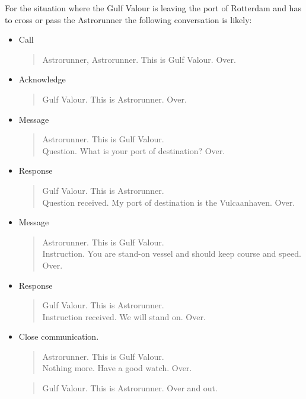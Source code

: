 For the situation where the Gulf Valour is leaving the port of Rotterdam and has to cross or pass the Astrorunner the following conversation is likely:
\begin{spacing}{1}
	\begin{itemize}
		\item Call
		\begin{quote}
			Astrorunner, Astrorunner. This is Gulf Valour. Over.
		\end{quote}
		\item Acknowledge
		\begin{quote}
			Gulf Valour. This is Astrorunner. Over.
		\end{quote}
		\item Message
		\begin{quote}
			Astrorunner. This is Gulf Valour. \\
			Question. What is your port of destination? Over.
		\end{quote}
		\item Response
		\begin{quote}
			Gulf Valour. This is Astrorunner. \\
			Question received. My port of destination is the Vulcaanhaven. Over.
		\end{quote}
		\item Message
		\begin{quote}
			Astrorunner. This is Gulf Valour. \\
			Instruction. You are stand-on vessel and should keep course and speed. Over.
		\end{quote}
		\item Response
		\begin{quote}
			Gulf Valour. This is Astrorunner. \\
			Instruction received. We will stand on. Over.
		\end{quote}
		\item Close communication.
		\begin{quote}
			Astrorunner. This is Gulf Valour. \\
			Nothing more. Have a good watch. Over.
		\end{quote}
		\begin{quote}
			Gulf Valour. This is Astrorunner. Over and out.
		\end{quote}
	\end{itemize}
\end{spacing}

